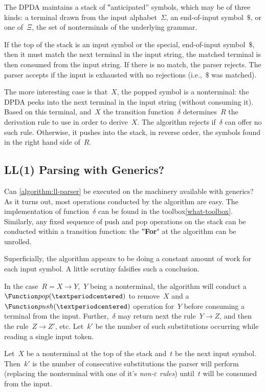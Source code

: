 The DPDA maintains a stack of ‟anticipated” symbols, which may
  be of three kinds: a terminal drawn from the input alphabet~$Σ$,
  an end-of-input symbol~$\$$, or one of~$Ξ$, the set of
  nonterminals of the underlying grammar.

If the top of the stack is an input symbol or the special,
 end-of-input symbol~$\$$, then it must match the next terminal
 in the input string, the matched terminal is then consumed from
 the input string.
If there is no match, the parser rejects.
The parser accepts if the input is exhausted with
  no rejections (i.e.,~$\$$ was matched).

The more interesting case is that~$X$, the popped symbol
  is a nonterminal: the DPDA peeks into the next terminal in the input
  string (without consuming it).
Based on this terminal, and~$X$ the transition function~$δ$
  determines~$R$ the derivation rule to use in order to derive~$X$.
The algorithm rejects if~$δ$ can offer no such rule.
Otherwise, it pushes into the stack, in reverse order, the symbols
  found in the right hand side of~$R$.

\subsection{LL(1) Parsing with \Java Generics?}
\label{section:limitations}
Can \cref{algorithm:ll-parser} be executed on the machinery
  available with \Java generics?
As it turns out, most operations conducted by the algorithm
  are easy.
The implementation of function~$δ$ can
  be found in the toolbox\cref{what-toolbox}.
Similarly, any fixed sequence of push and pop
  operations on the stack can be conducted within a \Java
  transition function:
  the ‟\textbf{For}" at the algorithm can be unrolled.

Superficially, the algorithm appears to be doing a constant amount
  of work for each input symbol.
A little scrutiny falsifies such a conclusion.

In the case~$R=X→Y$,~$Y$
  being a nonterminal, the algorithm will conduct
  a~$\Function pop(·)$ to remove~$X$ and a~$\Function push(·)$
  operation for~$Y$ before consuming a terminal from the input.
Further,~$δ$ may return next the rule~$Y→Z$,
  and then the rule~$Z→Z'$, etc.
Let~$k'$ be the number of such substitutions
  occurring while reading a single input token.

\begin{Definition}
  Let~$X$ be a nonterminal at the top of the stack
    and~$t$ be the next input symbol.
  Then~$k'$ is the number of consecutive substitutions
  the parser will perform (replacing the nonterminal with
  one of it's \emph{non-$ε$ rules}) until~$t$ will be consumed
  from the input.
\end{Definition}

